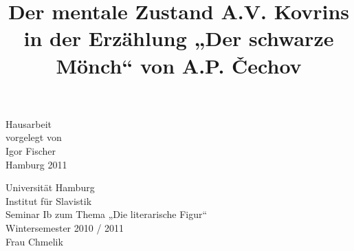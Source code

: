 \documentclass[12pt,headsepline,a4paper]{scrartcl}
\title{}
\author{}
\begin{document}
\begin{titlepage}
\date{}

\title{\Large Der mentale Zustand A.V. Kovrins in der Erzählung
„Der schwarze Mönch“ von A.P. Čechov}
{\let\newpage\relax\maketitle}

\begin{center}
\vfill
Hausarbeit\\
vorgelegt von\\
Igor Fischer \\
\null
Hamburg 2011
\vfill
\end{center}

\begin{minipage}{0.5\textwidth}
\begin{flushleft} 
Universität Hamburg\\
Institut für Slavistik\\
Seminar Ib zum Thema „Die literarische Figur“\\
Wintersemester 2010 / 2011\\
Frau Chmelik\\

\end{flushleft}
\end{minipage}
\vline
\begin{minipage}{0.5\textwidth}
\end{minipage}

\end{titlepage}

\tableofcontents
\thispagestyle{empty}
\newpage
\end{document}
